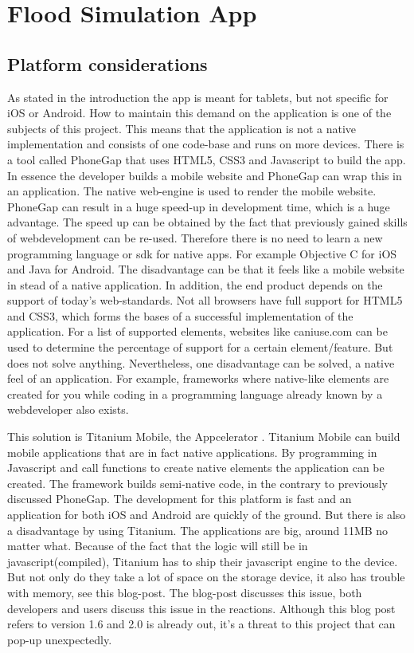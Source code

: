 \section{Flood Simulation App}
\subsection{Platform considerations}
As stated in the introduction the app is meant for tablets, but not specific for iOS or Android. How to maintain this demand on the application is one of the subjects of this project. This means that the application is not a native implementation and consists of one code-base and runs on more devices. There is a tool called PhoneGap  \cite{PhoneGap} that uses HTML5, CSS3 and Javascript to build the app. In essence the developer builds a mobile website and PhoneGap can wrap this in an application. The native web-engine is used to render the mobile website. PhoneGap can result in a huge speed-up in development time, which is a huge advantage.  The speed up can be obtained by the fact that previously gained skills of webdevelopment can be re-used. Therefore there is no need to learn a new programming language or sdk for native apps. For example Objective C for iOS and Java for Android. The disadvantage can be that it feels like a mobile website in stead of a native application. In addition, the end product depends on the support of today's web-standards. Not all browsers have full support for HTML5 and CSS3, which forms the bases of a successful implementation of the application. For a list of supported elements, websites like caniuse.com \cite{CSS3} can be used to determine the percentage of support for a certain element/feature. But does not solve anything. Nevertheless, one disadvantage can be solved, a native feel of an application. For example, frameworks where native-like elements are created for you while coding in a programming language already known by a webdeveloper also exists.

This solution is Titanium Mobile, the Appcelerator \cite{Titanium-Appcelerator}. Titanium Mobile can build mobile applications that are in fact native applications. By programming in Javascript and call functions to create native elements the application can be created. The framework builds semi-native code, in the contrary to previously discussed PhoneGap. The development for this platform is fast and an application for both iOS and Android are quickly of the ground. But there is also a disadvantage by using Titanium. The applications are big, around 11MB no matter what. Because of the fact that the logic will still be in javascript(compiled), Titanium has to ship their javascript engine to the device. But not only do they take a lot of space on the storage device, it also has trouble with memory, see this blog-post\cite{memoryleak}. The blog-post discusses this issue, both developers and users discuss this issue in the reactions. Although this blog post refers to version 1.6 and 2.0 is already out, it's a threat to this project that can pop-up unexpectedly.

